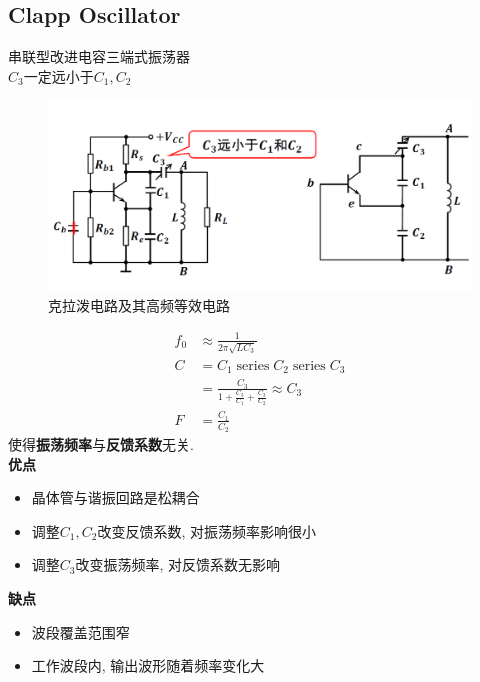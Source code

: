 \documentclass[a4paper]{report}
\begin{document}
\subsection{Clapp Oscillator}
串联型改进电容三端式振荡器\\
$C_3$一定远小于$C_1,C_2$
\begin{figure}[H]
\centering
\includegraphics[width=1\textwidth]{osc_clapp.png}
\caption{克拉泼电路及其高频等效电路}
\end{figure}
\begin{align*}
  f_0&\approx\frac{1}{2\pi\sqrt{LC_3}}\\
  C&=C_1\;\text{series}\;C_2\;\text{series}\;C_3\\
  &=\frac{C_3}{1+\frac{C_3}{C_1}+\frac{C_3}{C_2}}\approx C_3\\
  F&=\frac{C_1}{C_2}
\end{align*}
使得\textbf{振荡频率}与\textbf{反馈系数}无关. \\
\textbf{优点}
\begin{itemize}
  \item 晶体管与谐振回路是松耦合
  \item 调整$C_1,C_2$改变反馈系数, 对振荡频率影响很小
  \item 调整$C_3$改变振荡频率, 对反馈系数无影响
\end{itemize}
\textbf{缺点}
\begin{itemize}
  \item 波段覆盖范围窄
  \item 工作波段内, 输出波形随着频率变化大
\end{itemize}
\end{document}
